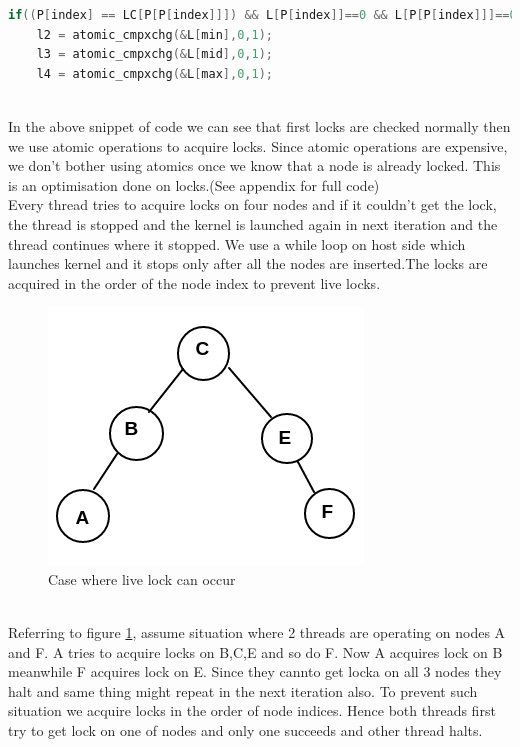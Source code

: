 \documentclass[BTech]{iitmdiss}
\begin{document}
\lstset{style=mystyle}
\begin{lstlisting}[language=C]
if((P[index] == LC[P[P[index]]]) && L[P[index]]==0 && L[P[P[index]]]==0 && L[RC[P[P[index]]]]==0){
    l2 = atomic_cmpxchg(&L[min],0,1); 
    l3 = atomic_cmpxchg(&L[mid],0,1);
    l4 = atomic_cmpxchg(&L[max],0,1);
\end{lstlisting}\\
In the above snippet of code we can see that first locks are checked normally then we use atomic operations to acquire locks. Since atomic operations are expensive, we don't bother using atomics once we know that a node is already locked. This is an optimisation done on locks.(See appendix for full code)\\
Every thread tries to acquire locks on four nodes and if it couldn't get the lock, the thread is stopped and the kernel is launched again in next iteration and the thread continues where it stopped. We use a while loop on host side which launches kernel and it stops only after all the nodes are inserted.The locks are acquired in the order of the node index to prevent live locks.\\
\begin{figure}[h]
    \centering
    \includegraphics{img2.png}
    \caption{Case where live lock can occur}
    \label{fig:livelock}
\end{figure}\\
Referring to figure \ref{fig:livelock}, assume situation where 2 threads are operating on nodes A and F. A tries to acquire locks on B,C,E and so do F. Now A acquires lock on B meanwhile F acquires lock on E. Since they cannto get locka on all 3 nodes they halt and same thing might repeat in the next iteration also. To prevent such situation we acquire locks in the order of node indices. Hence both threads first try to get lock on one of nodes and only one succeeds and other thread halts.
\end{document}
